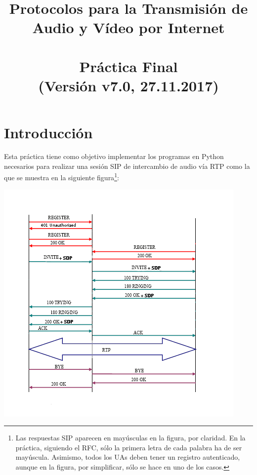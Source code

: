 \documentclass[a4paper,11pt]{article}
\begin{document}
\title{Protocolos para la Transmisión de Audio y Vídeo por Internet\\ 
\ \\ 
Práctica Final \\
(Versión v7.0, 27.11.2017) %
}

\maketitle
\thispagestyle{empty}
\tableofcontents
\newpage


\section{Introducción}

Esta práctica tiene como objetivo implementar los programas en Python 
necesarios para realizar una sesión SIP de intercambio de audio vía RTP
como la que se muestra en la siguiente figura\footnote{Las respuestas SIP
aparecen en mayúsculas en la figura, por claridad. En la práctica, siguiendo
el RFC, sólo la primera letra de cada palabra ha de ser mayúscula. Asimismo, todos los UAs deben tener un registro autenticado, aunque en la figura, por simplificar, sólo se hace en uno de los casos.}:

\begin{center}
\includegraphics{figs/complete-sip-session-auth.png}
\end{center}
\end{document}
